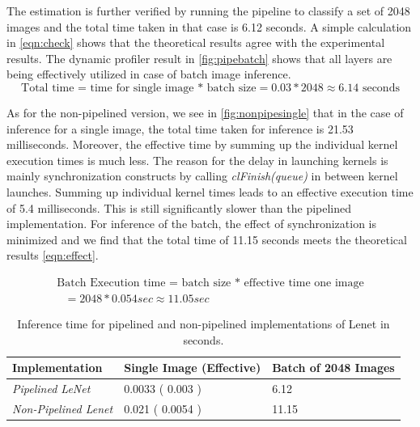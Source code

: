 The estimation is further verified by running the pipeline to classify a set of 2048 images and the total time taken in that case is 6.12 seconds. A simple calculation in \ref{eqn:check} shows that the theoretical results agree with the experimental results. The dynamic profiler result in \ref{fig:pipebatch} shows that all layers are being effectively utilized in case of batch image inference. 
\begin{equation}
\text{Total time = time for single image * batch size} = 0.03 * 2048 \approx 6.14\text{ seconds}
\label{eqn:check}
\end{equation}

As for the non-pipelined version, we see in \ref{fig:nonpipesingle} that in the case of inference for a single image,  the total time taken for inference is 21.53 milliseconds. Moreover, the effective time by summing up the individual kernel execution times is much less. The reason for the delay in launching kernels is mainly synchronization constructs by calling \emph{clFinish(queue)} in between kernel launches. Summing up individual kernel times leads to an effective execution time of 5.4 milliseconds. This is still significantly slower than the pipelined implementation. For inference of the batch, the effect of synchronization is minimized and we find that the total time of 11.15 seconds meets the theoretical results \ref{eqn:effect}.

\begin{equation}
\begin{array}{l}

\text{Batch Execution time = batch size * effective time one image} \\
  \text{        } = 2048 * 0.054 sec \approx 11.05 sec
\end{array}
\label{eqn:effect}
\end{equation}


\begin{table}[]
\begin{tabular}{|l|l|l|}
\hline
Implementation               & \textbf{Single Image (Effective)} & \textbf{Batch of 2048 Images} \\ \hline
\textit{Pipelined LeNet}     & 0.0033 ( 0.003 )                 & 6.12                          \\ \hline
\textit{Non-Pipelined Lenet} & 0.021 ( 0.0054 )                  & 11.15                         \\ \hline
\end{tabular}
\caption{Inference time for pipelined and non-pipelined implementations of Lenet in seconds. }
\label{tab:resultinf}
\end{table}

